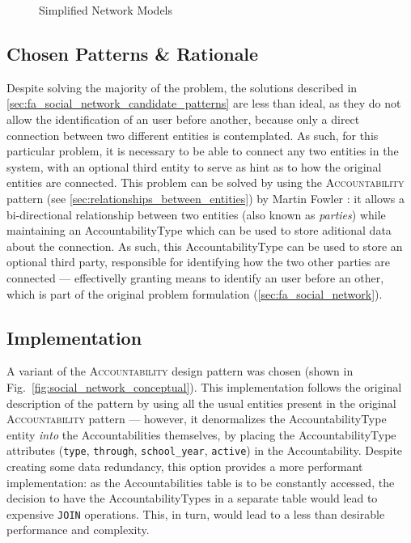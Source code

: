 \begin{figure}[H]
  \centering
  \hspace{20mm}
  \caption{Simplified Network Models}
  \label{fig:simplified_network_models}
\end{figure}

\subsection{Chosen Patterns \& Rationale}\label{sec:fa_social_network_chosen_patterns_rationale}

Despite solving the majority of the problem, the solutions described in \ref{sec:fa_social_network_candidate_patterns} are less than ideal, as they do not allow the identification of an user before another, because only a direct connection between two different entities is contemplated. As such, for this particular problem, it is necessary to be able to connect any two entities in the system, with an optional third entity to serve as hint as to how the original entities are connected. This problem can be solved by using the \textsc{Accountability} pattern (see \ref{sec:relationships_between_entities}) by Martin Fowler \cite{fowler_accountability}: it allows a bi-directional relationship between two entities (also known as \emph{parties}) while maintaining an AccountabilityType which can be used to store aditional data about the connection. As such, this AccountabilityType can be used to store an optional third party, responsible for identifying how the two other parties are connected --- effectivelly granting means to identify an user before an other, which is part of the original problem formulation (\ref{sec:fa_social_network}).

\subsection{Implementation}\label{sec:fa_social_network_implementation}

A variant of the \textsc{Accountability} design pattern was chosen (shown in Fig.~\ref{fig:social_network_conceptual}). This implementation follows the original description of the pattern by using all the usual entities present in the original \textsc{Accountability} pattern \cite{fowler_accountability} --- however, it denormalizes the AccountabilityType entity \emph{into} the Accountabilities themselves, by placing the AccountabilityType attributes (\verb!type!, \verb!through!, \verb!school_year!, \verb!active!) in the Accountability. Despite creating some data redundancy, this option provides a more performant implementation: as the Accountabilities table is to be constantly accessed, the decision to have the AccountabilityTypes in a separate table would lead to expensive \verb!JOIN! operations. This, in turn, would lead to a less than desirable performance and complexity.


